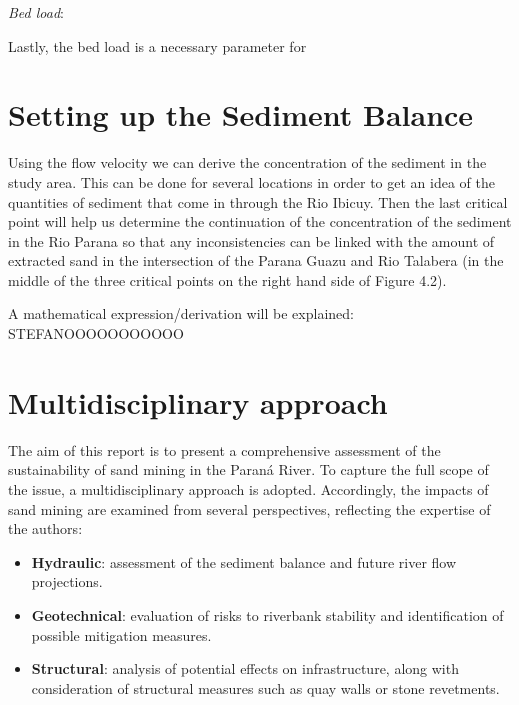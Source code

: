 \textit{Bed load}:

Lastly, the bed load is a necessary parameter for 

\section{Setting up the Sediment Balance}
Using the flow velocity we can derive the concentration of the sediment in the study area. This can be done for several locations in order to get an idea of the quantities of sediment that come in through the Rio Ibicuy. Then the last critical point will help us determine the continuation of the concentration of the sediment in the Rio Parana so that any inconsistencies can be linked with the amount of extracted sand in the intersection of the Parana Guazu and Rio Talabera (in the middle of the three critical points on the right hand side of Figure 4.2).

A mathematical expression/derivation will be explained:
STEFANOOOOOOOOOOO

\section{Multidisciplinary approach}
The aim of this report is to present a comprehensive assessment of the sustainability of sand mining in the Paraná River. To capture the full scope of the issue, a multidisciplinary approach is adopted. Accordingly, the impacts of sand mining are examined from several perspectives, reflecting the expertise of the authors:

\begin{itemize}
    \item \textbf{Hydraulic}: assessment of the sediment balance and future river flow projections.
    \item \textbf{Geotechnical}: evaluation of risks to riverbank stability and identification of possible mitigation measures.
    \item \textbf{Structural}: analysis of potential effects on infrastructure, along with consideration of structural measures such as quay walls or stone revetments.
\end{itemize}
